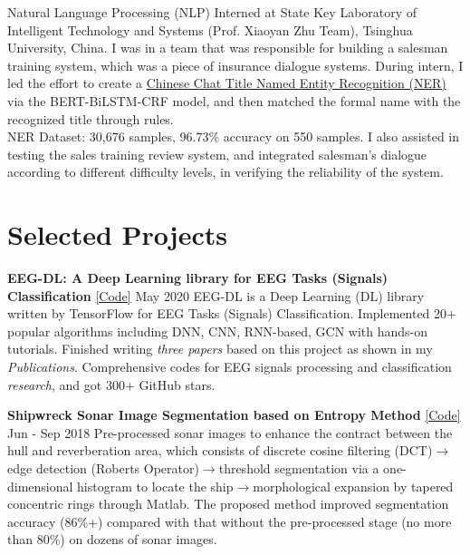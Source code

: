\documentclass{my_cv}
\begin{document}
\hspace*{\fill} 

\workitemsthree
{Natural Language Processing (NLP) Interned at State Key Laboratory of Intelligent Technology and Systems (Prof. Xiaoyan Zhu Team), Tsinghua University, China.}
{I was in a team that was responsible for building a salesman training system, which was a piece of insurance dialogue systems. During intern, I led the effort to create a \href{https://github.com/SuperBruceJia/Chinese-Chat-Title-NER-BERT-BiLSTM-CRF}{Chinese Chat Title Named Entity Recognition (NER)} via the BERT-BiLSTM-CRF model, and then matched the formal name with the recognized title through rules. \\NER Dataset: 30,676 samples, 96.73\% accuracy on 550 samples.}
{I also assisted in testing the sales training review system, and integrated salesman’s dialogue according to different difficulty levels, in verifying the reliability of the system.}

\hspace*{\fill} 

\section{Selected Projects}

\noindent \textbf{EEG-DL: A Deep Learning library for EEG Tasks (Signals) Classification} \href{https://github.com/SuperBruceJia/EEG-DL}{[Code]} \hfill May 2020 
\workitemsfour
{EEG-DL is a Deep Learning (DL) library written by TensorFlow for EEG Tasks (Signals) Classification.}
{Implemented 20+ popular algorithms including DNN, CNN, RNN-based, GCN with hands-on tutorials.}
{Finished writing \emph{three papers} based on this project as shown in my \emph{Publications}.}
{Comprehensive codes for EEG signals processing and classification \emph{research}, and got 300+ GitHub stars.}

\hspace*{\fill} 

\noindent \textbf{Shipwreck Sonar Image Segmentation based on Entropy Method} \href{https://github.com/SuperBruceJia/Sonar-Image-Segmentation-through-Entropy-Method}{[Code]} \hfill Jun - Sep 2018 
\workitemstwo
{Pre-processed sonar images to enhance the contract between the hull and reverberation area, which consists of discrete cosine filtering (DCT)$\rightarrow$edge detection (Roberts Operator)$\rightarrow$threshold segmentation via a one-dimensional histogram to locate the ship$\rightarrow$morphological expansion by tapered concentric rings through Matlab.}
{The proposed method improved segmentation accuracy (86\%+) compared with that without the pre-processed stage (no more than 80\%) on dozens of sonar images.}
\end{document}
